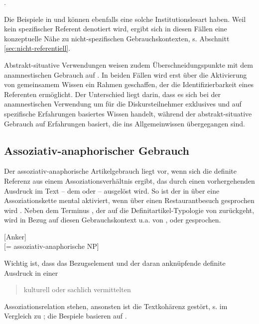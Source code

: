 \begin{exe}
	\ex \label{ex:post} .
\end{exe}

\noindent
Die Beispiele in  und  können ebenfalls eine solche Institutionslesart haben. Weil kein spezifischer Referent denotiert wird, ergibt sich in diesen Fällen eine konzeptuelle Nähe zu nicht-spezifischen Gebrauchskontexten, s. Abschnitt \ref{sec:nicht-referentiell}.

Abstrakt-situative Verwendungen weisen zudem Überschneidungspunkte mit dem anamnestischen Gebrauch auf \parencite[62]{Himmelmann1997}. In beiden Fällen wird erst über die Aktivierung von gemeinsamem Wissen ein Rahmen geschaffen, der die Identifizierbarkeit eines Referenten ermöglicht. Der Unterschied liegt darin, dass es sich bei der anamnestischen Verwendung um für die Diskursteilnehmer exklusives und auf spezifische Erfahrungen basiertes Wissen handelt, während der abstrakt-situative Gebrauch auf Erfahrungen basiert, die ins Allgemeinwissen übergegangen sind. 

\subsection{Assoziativ-anaphorischer Gebrauch}\label{sec:asso}

Der assoziativ-anaphorische Artikelgebrauch liegt vor, wenn sich die definite Referenz aus einem Assoziationsverhältnis ergibt, das durch einen vorhergehenden Ausdruck im Text -- dem  \parencite[49]{Hawkins1978} oder  \parencite[6]{Cui2014} -- ausgelöst wird. So ist der  in  über eine Assoziationskette mental aktiviert, wenn über einen Restaurantbesuch gesprochen wird \parencite[Beispiel in Anlehnung an][50]{Schwarz2000}. Neben dem Terminus , der auf die Definitartikel-Typologie von \textcite{Hawkins1978} zurückgeht, wird in Bezug auf diesen Gebrauchskontext u.a. von  \parencite{Clark1977},  \parencite{Prince1981} oder  \parencite{Schwarz2000} gesprochen.  

\begin{exe}
	\ex \label{ex:asso}  [Anker] \\ [= assoziativ-anaphorische NP]  
\end{exe}
\noindent 
Wichtig ist, dass das Bezugselement und der daran anknüpfende definite Ausdruck in einer \blockcquote[36]{Himmelmann1997}{kulturell oder sachlich vermittelten} Assoziationsrelation stehen, ansonsten ist die Textkohärenz gestört, s.  im Vergleich zu ; die Bespiele basieren auf \textcite[123]{Hawkins1978}.

